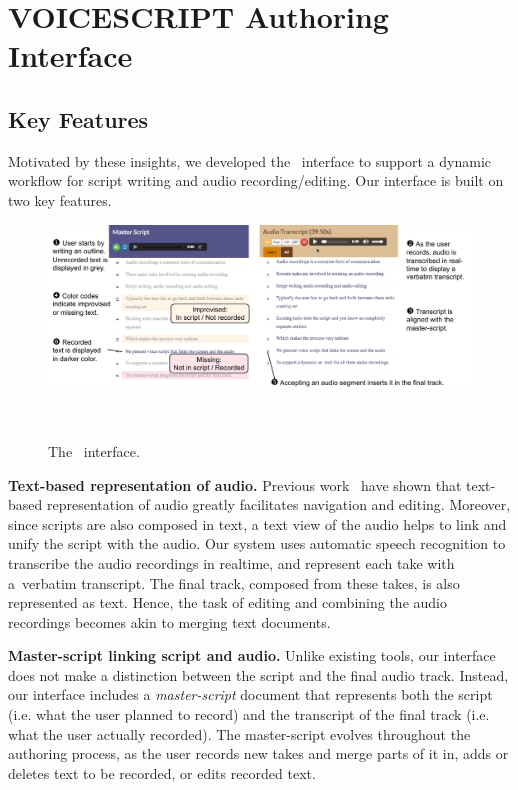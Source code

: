 \section{VOICESCRIPT Authoring Interface}

\subsection{Key Features} Motivated by these insights, we developed the \systemname\  interface to support a dynamic workflow for script writing and  audio recording/editing. Our interface is built on two key features. 

\begin{figure}
  \centering
  \includegraphics[width=2.0\columnwidth]{figures/ui_aligned}
  \caption{The \systemname\ interface. }~\label{fig:ui_aligned}
\end{figure}

\textbf{Text-based representation of audio.} Previous work~\cite{casares2002simplifying,whittaker2004semantic,berthouzoz2012tools,rubin2013content} have shown that text-based representation of audio greatly facilitates navigation and editing. Moreover, since scripts are also composed in text, a text view of the audio  helps to link and unify the script
with the audio.
 Our system uses automatic speech recognition to transcribe the audio recordings in realtime, and represent each take with a\ verbatim transcript. The final track, composed from these takes, is also represented as text. Hence, the task of editing and combining the audio recordings becomes akin to merging text documents. 

\textbf{Master-script linking script and audio.} Unlike existing tools, our interface does not make a distinction between the script and the final audio track. Instead, our interface includes a \textit{master-script} document that represents both the script (i.e. what the user planned to record) and the transcript of the final track (i.e. what the user actually recorded). The master-script evolves throughout the authoring process, as the user records new takes and merge parts of it in, adds or deletes text to be recorded, or edits recorded text. 


